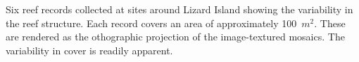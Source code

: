\label{fig:reef_record_example}Six reef records collected at sites around Lizard Island showing the variability in the reef structure.  Each record covers an area of approximately 100~$m^2$.  These are rendered as the othographic projection of the image-textured mosaics. The variability in cover is readily apparent.